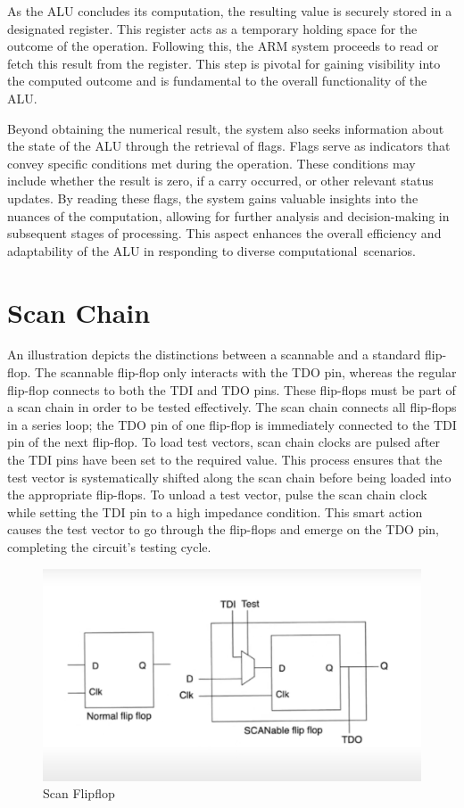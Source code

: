 \documentclass[a4paper,12pt,english]{report}
\begin{document}
As the ALU concludes its computation, the resulting value is securely stored in a designated register. This register acts as a temporary holding space for the outcome of the operation. Following this, the ARM system proceeds to read or fetch this result from the register. This step is pivotal for gaining visibility into the computed outcome and is fundamental to the overall functionality of the ALU.

Beyond obtaining the numerical result, the system also seeks information about the state of the ALU through the retrieval of flags. Flags serve as indicators that convey specific conditions met during the operation. These conditions may include whether the result is zero, if a carry occurred, or other relevant status updates. By reading these flags, the system gains valuable insights into the nuances of the computation, allowing for further analysis and decision-making in subsequent stages of processing. This aspect enhances the overall efficiency and adaptability of the ALU in responding to diverse computational scenarios.

\newpage
\section{Scan Chain}
 An illustration depicts the distinctions between a scannable and a standard flip-flop. The scannable flip-flop only interacts with the TDO pin, whereas the regular flip-flop connects to both the TDI and TDO pins. These flip-flops must be part of a scan chain in order to be tested effectively. The scan chain connects all flip-flops in a series loop; the TDO pin of one flip-flop is immediately connected to the TDI pin of the next flip-flop.  To load test vectors, scan chain clocks are pulsed after the TDI pins have been set to the required value. This process ensures that the test vector is systematically shifted along the scan chain before being loaded into the appropriate flip-flops. To unload a test vector, pulse the scan chain clock while setting the TDI pin to a high impedance condition. This smart action causes the test vector to go through the flip-flops and emerge on the TDO pin, completing the circuit's testing cycle.

 \begin{figure}[h!]
  \centering
  \includegraphics[width=0.7\linewidth]{scanff.png}
  \caption{Scan Flipflop}
\end{figure}
\end{document}
